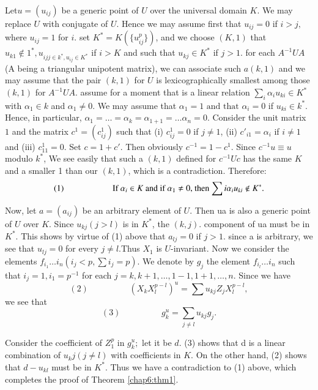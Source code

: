 Let\pageoriginale $u=(u_{ij})$ be a  generic point of $U$ over the
universal domain $K$. We may 
replace $U$ with conjugate of $U$. Hence we may assume first that
$u_{ij}=0$ if $i>j,$ where $u_{ij}=1$ for $i$. set
$K^\ast=K(\bigg\{u^{p}_{ij}\bigg\})$, and we choose $(K, 1)$ that
$u_{k1}\notin 1^\ast , u_{ijj \in k^\ast , u_{ij} \in K^\ast }$ if
$i>K$ and such that $u_{kj}\in K^\ast$ if $j>1$. for each $A^{-1 }U A
$ (A being a triangular unipotent matrix), we can associate such $a
(k, 1)$ and we may assume that the pair $(k,1)$ for ${U}$ is
lexicographically smallest among those $(k, 1)$ for $A^{-1} U
A$. assume for a moment that is a linear relation $\sum_i \alpha_i
u_{ki}\in K^\ast$ with $\alpha_1 \in k$ and $\alpha_1\neq 0 $. We may
assume that $\alpha_1=1\text{ and that }\alpha_i=0$ if $u_{ki}\in
k^\ast $. Hence, in particular, $\alpha_1= \ldots = \alpha _k=
\alpha_{1+1}=\ldots  \alpha_n =0 $. Consider the unit matrix $1$ and
the matrix $c^{1}= (c^{1}_{ij})$ such that (i) $c^{1}_{ij}=0$ if $j
\neq 1$, (ii) $c'_{i1}=\alpha_i$ if $i \neq 1$ and (iii)
$c^{1}_{11}=0$. Set $c=1+c'$. Then obviously $c^{-1}= 1-c^1$. Since $
c^{-1}u \equiv u$ modulo $k^\ast$, We see easily that such a $(k,1)$
defined for $c^{-1}U c$ has the same $K$ and a smaller 1 than our
$(k,1)$, which is a contradiction. Therefore: 
$$
(1) \hspace{2cm} \text{If $  \alpha _i \in  K$ and if $\alpha_1 \neq
    0$, then $\sum i  \alpha_i u_{ki} \notin K^\ast$.}
$$


  Now, let $a = {(a_{ij})}$ be an arbitrary element of $U$. Then ua is
  also a generic point of $U$ over  $K$. Since  $u_{kj}(j>l)$ is in
  $K^\ast$, the $(k, j)$. component of ua must be in $K^\ast$. This
  shows by virtue of (1) above that $ a_{lj}=0$ if $j>1$. since a is
  arbitrary, we see that $u_{lj}=0$ for every $j \neq l$.Thus $X_1$ is
  $U$-invariant. Now we consider the elements $ f_{i_{1}} \ldots i_n
  (i_j < p, \sum i_j =p)$. We denote by ${g_j}$ the element $
  {f_{i_{l}} \ldots i_n}$ such that ${i_j=1, i_1=p^{-1}}$ for each $
  {j=k, k+1, \ldots , 1-1, 1+1, \ldots , n}$.  Since we have 
  $$ 
(2) \hspace{2cm}  {(X_k X^{p-l}_{l})^u= \sum u_{kj}Z_j X^{p-l}_{l}},
  $$\pageoriginale
  we see that
  $$ 
(3) \hspace{2cm}  {g^u_k = \sum_{j \neq l} u_{kj}g_j}.
  $$

Consider the coefficient of ${Z^p_1}$ in ${g^u_k};$ let it be $d$. (3)
shows that d is a linear combination of ${u_kj(j \neq l)}$ with
coefficients in $K$. On the other hand, (2) shows that ${d-u_{kl}}$
must be in $K^\ast$. Thus we have a contradiction to (1) above, which
completes the proof of Theorem \ref{chap6:thm1}.  


